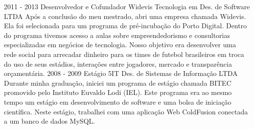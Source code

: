    {}
\cvevent
    {2011 - 2013}
    {Desenvolvedor e Cofundador}
    {Widevis Tecnologia em Des. de Software LTDA}
    {Após a conclusão do meu mestrado, abri uma empresa chamada Widevis. Ela foi selecionada para um programa de pré-incubação do Porto Digital. Dentro do programa tivemos acesso a aulas sobre empreendedorismo e consultorias especializadas em negócios de tecnologia. Nosso objetivo era desenvolver uma rede social para arrecadar dinheiro para os times de futebol brasileiros em troca do uso de seus estádios, interações entre jogadores, mercado e transparência orçamentária.}
    {}
    {}
    {}
\cvevent
    {2008 - 2009}
    {Estágio}
    {5IT Des. de Sistemas de Informação LTDA}
    {Durante minha graduação, iniciei um programa de estágio chamada BITEC promovido pelo Instituto Euvaldo Lodi (IEL). Este programa era ao mesmo tempo um estágio em desenvolvimento de software e uma bolsa de iniciação científica. Neste estágio, trabalhei com uma aplicação Web ColdFusion conectada a um banco de dados MySQL.}
    {}
    {}
    {}
